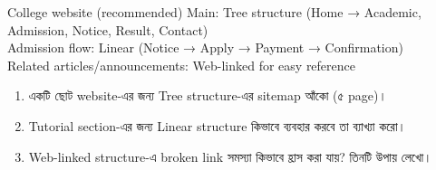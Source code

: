 \begin{examplebox}{College website (recommended)}
Main: Tree structure (Home → Academic, Admission, Notice, Result, Contact)\\
Admission flow: Linear (Notice → Apply → Payment → Confirmation)\\
Related articles/announcements: Web-linked for easy reference
\end{examplebox}

\begin{practicebox}
\begin{enumerate}
\item একটি ছোট website-এর জন্য Tree structure-এর sitemap আঁকো (৫ page)।
\item Tutorial section-এর জন্য Linear structure কিভাবে ব্যবহার করবে তা ব্যাখ্যা করো।
\item Web-linked structure-এ broken link সমস্যা কিভাবে হ্রাস করা যায়? তিনটি উপায় লেখো।
\end{enumerate}
\end{practicebox}
